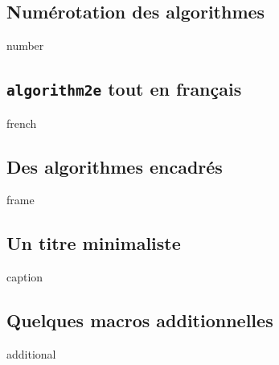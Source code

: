 \subsection{Numérotation des algorithmes}

{number}




\subsection{\texttt{algorithm2e} tout en français}

{french}




\subsection{Des algorithmes encadrés}

{frame}




\subsection{Un titre minimaliste}

{caption}




\subsection{Quelques macros additionnelles} \label{algo-extra}

{additional}